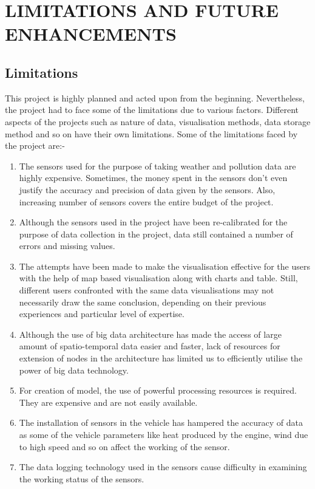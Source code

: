 \cleardoublepage
\section{LIMITATIONS AND FUTURE ENHANCEMENTS}
\subsection{Limitations}
This project is highly planned and acted upon from the beginning. Nevertheless, the project had to face some of the limitations due to various factors. Different aspects of the projects such as nature of data, visualisation methods, data storage method and so on have their own limitations. Some of the limitations faced by the project are:-

\begin{enumerate}
  \setlength\itemsep{1.5em}
	\item The sensors used for the purpose of taking weather and pollution data are highly expensive. Sometimes, the money spent in the sensors don't even justify the accuracy and precision of data given by the sensors. Also, increasing number of sensors covers the entire budget of the project.
	\item Although the sensors used in the project have been re-calibrated for the purpose of data collection in the project, data still contained a number of errors and missing values. 
	\item The attempts have been made to make the visualisation effective for the users with the help of map based visualisation along with charts and table. Still, different users confronted with the same data visualisations may not necessarily draw the same conclusion, depending on their previous experiences and particular level of expertise.
	\item Although the use of big data architecture has made the access of large amount of spatio-temporal data easier and faster, lack of resources for extension of nodes in the architecture has limited us to efficiently utilise the power of big data technology.
	\item For creation of model, the use of powerful processing resources is required. They are expensive and are not easily available.
	\item The installation of sensors in the vehicle has hampered the accuracy of data as some of the vehicle parameters like heat produced by the engine, wind due to high speed and so on affect the working of the sensor.
	\item The data logging technology used in the sensors cause difficulty in examining the working status of the sensors.
\end{enumerate}

